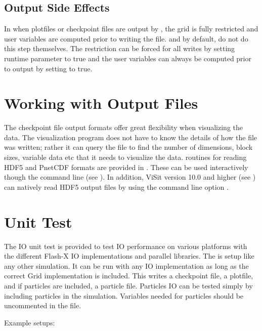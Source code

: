 \subsection{Output Side Effects}
In \flashx when plotfiles or checkpoint files are output by 
, the grid is fully restricted and user variables are
computed prior to writing the file.   and 
 by default, do not do this step themselves.  The restriction
can be forced for all writes by setting runtime parameter  to 
true and the user variables can always be computed prior to output by setting
 to true.  


\section{Working with Output Files}

The checkpoint file output formats offer great flexibility when
visualizing the data. The visualization program does not have to
know the details of how the file was written; rather it can query
the file to find the number of dimensions, block sizes, variable
data etc that it needs to visualize the data.  routines
for reading HDF5 and PnetCDF formats are provided in
.  These can be used interactively though the
 command line (see ).
In addition, ViSit version 10.0 and higher (see ) can natively read 
\flashx HDF5 output files by using the command line option
.


\section{Unit Test}\label{Sec:IO Unit Test}
The \unit{IO} unit test is provided to test IO performance on various platforms
with the different Flash-X IO implementations and parallel libraries.
The  is setup like any other \flashx simulation.  It can be run
with any IO implementation as long as the correct Grid implementation
is included.  This  writes a checkpoint file, a plotfile, and
if particles are included, a particle file.
Particles IO can be
tested simply by including particles in the simulation.  Variables needed
for particles should be uncommented in the  file.


Example setups:

